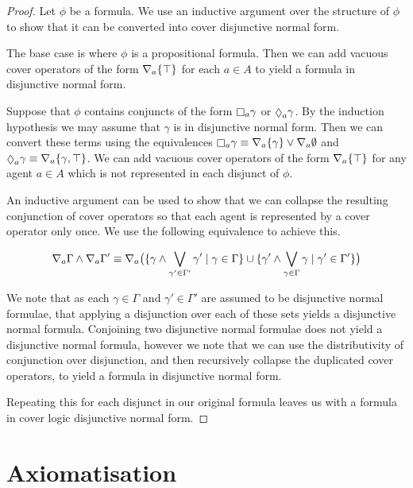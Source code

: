 \begin{proof}
Let $\phi$ be a \logicK{} formula. We use an inductive argument over the
structure of $\phi$ to show that it can be converted into cover disjunctive
normal form.

The base case is where $\phi$ is a propositional formula. Then we can add
vacuous cover operators of the form $\nabla_a \{\top\}$ for each $a \in A$ to
yield a formula in disjunctive normal form.

Suppose that $\phi$ contains conjuncts of the form $\knows_a \gamma$ or
$\suspects_a \gamma$. By the induction hypothesis we may assume that $\gamma$ is
in disjunctive normal form. Then we can convert these terms using the
equivalences $\knows_a \gamma \equiv \covers_a \{\gamma\} \lor \covers_a
\emptyset$ and $\suspects_a \gamma \equiv \covers_a \{\gamma, \top\}$. We can
add vacuous cover operators of the form $\nabla_a \{\top\}$ for any agent $a
\in A$ which is not represented in each disjunct of $\phi$.

An inductive argument can be used to show that we can collapse the resulting
conjunction of cover operators so that each agent is represented by a cover
operator only once. We use the following equivalence to achieve this.

$$
\nabla_a \Gamma \land \nabla_a \Gamma' \equiv 
\nabla_a \big( 
\{ \gamma \land \bigvee_{\gamma' \in \Gamma'} \gamma' \mid \gamma \in \Gamma \}
\cup
\{ \gamma' \land \bigvee_{\gamma \in \Gamma} \gamma \mid \gamma' \in \Gamma' \}
\big)
$$

We note that as each $\gamma \in \Gamma$ and $\gamma' \in \Gamma'$ are assumed
to be disjunctive normal formulae, that applying a disjunction over each of
these sets yields a disjunctive normal formula. Conjoining two disjunctive
normal formulae does not yield a disjunctive normal formula, however we note
that we can use the distributivity of conjunction over disjunction, and then
recursively collapse the duplicated cover operators, to yield a formula in
disjunctive normal form.

Repeating this for each disjunct in our original formula leaves us with a
formula in cover logic disjunctive normal form.
\end{proof}

\section{Axiomatisation}

